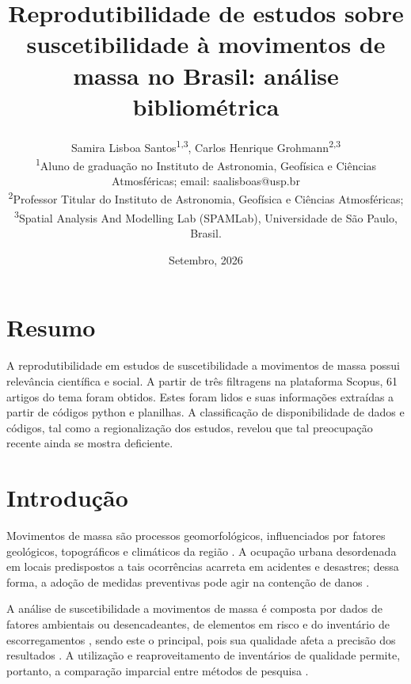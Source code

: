 \documentclass[twocolumn, A4]{article}
\begin{document}
\title{Reprodutibilidade de estudos sobre suscetibilidade à movimentos de massa no Brasil: 
análise bibliométrica}
\author{
	Samira  Lisboa Santos\textsuperscript{1,3},
	Carlos Henrique Grohmann\textsuperscript{2,3}
 	\\[0.2cm]
	{\small \textsuperscript{1}Aluno de graduação no Instituto de Astronomia, Geofísica e Ciências Atmosféricas; email: saalisboas@usp.br} \\
	{\small \textsuperscript{2}Professor Titular do Instituto de Astronomia, Geofísica e Ciências Atmosféricas;} \\
	{\small \textsuperscript{3}Spatial Analysis And Modelling Lab (SPAMLab), Universidade de São Paulo, Brasil.}
}
\date{Setembro, 2026}

\maketitle
\newpage

\section{Resumo}
A reprodutibilidade em estudos de suscetibilidade a movimentos de massa possui relevância científica e social. A partir de três filtragens na plataforma Scopus, 61 artigos do tema foram obtidos. Estes foram lidos e suas informações extraídas a partir de códigos python e planilhas. A classificação de disponibilidade de dados e códigos, tal como a regionalização dos estudos, revelou que tal preocupação recente ainda se mostra deficiente.

\section{Introdução}
Movimentos de massa são processos geomorfológicos, influenciados por fatores geológicos, 
topográficos e climáticos da região \citep{Varnes1978}. A ocupação urbana desordenada 
em locais predispostos a tais ocorrências acarreta em acidentes e desastres; dessa forma,
a adoção de medidas preventivas pode agir na contenção de danos \citep{ConhecerPrevenir}. 

A análise de suscetibilidade a movimentos de massa é composta por dados de fatores 
ambientais ou desencadeantes, de elementos em risco e do inventário de escorregamentos 
\citep{VanWesten}, sendo este o principal, pois sua qualidade afeta a precisão 
dos resultados \citep{Steger20162729}. A utilização e reaproveitamento de inventários de 
qualidade permite, portanto, a comparação imparcial entre métodos de pesquisa 
\citep{Coelho2024}. 
\end{document}
